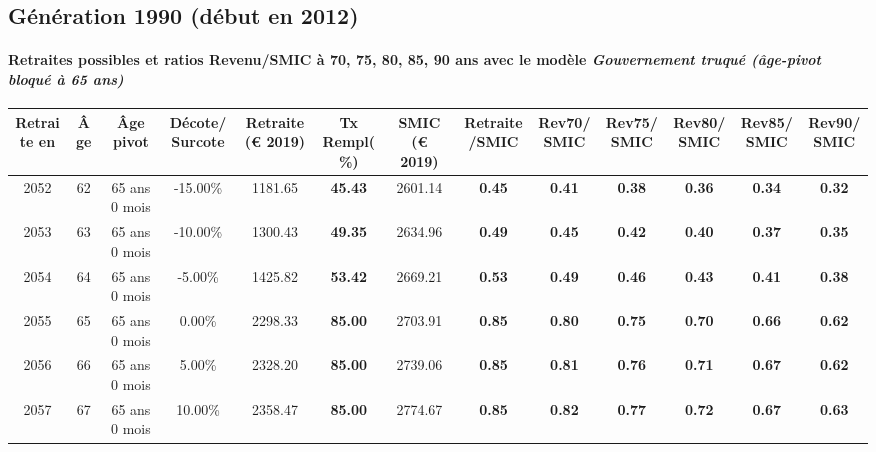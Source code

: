 \newpage 
 
\subsection{Génération 1990 (début en 2012)} 

\paragraph{Retraites possibles et ratios Revenu/SMIC à 70, 75, 80, 85, 90 ans avec le modèle \emph{Gouvernement truqué (âge-pivot bloqué à 65 ans)}}  
 
{ \scriptsize \begin{center} 
\begin{tabular}[htb]{|c|c||c|c||c|c||c||c|c|c|c|c|c|} 
\hline 
 Retraite en &  Âge &  Âge pivot &  Décote/Surcote &  Retraite (\euro{} 2019) &  Tx Rempl(\%) &  SMIC (\euro{} 2019) &  Retraite/SMIC &  Rev70/SMIC &  Rev75/SMIC &  Rev80/SMIC &  Rev85/SMIC &  Rev90/SMIC \\ 
\hline \hline 
 2052 &  62 &  65 ans 0 mois &  -15.00\% &  1181.65 &  {\bf 45.43} &  2601.14 &  {\bf {\color{red} 0.45}} &  {\bf {\color{red} 0.41}} &  {\bf {\color{red} 0.38}} &  {\bf {\color{red} 0.36}} &  {\bf {\color{red} 0.34}} &  {\bf {\color{red} 0.32}} \\ 
\hline 
 2053 &  63 &  65 ans 0 mois &  -10.00\% &  1300.43 &  {\bf 49.35} &  2634.96 &  {\bf {\color{red} 0.49}} &  {\bf {\color{red} 0.45}} &  {\bf {\color{red} 0.42}} &  {\bf {\color{red} 0.40}} &  {\bf {\color{red} 0.37}} &  {\bf {\color{red} 0.35}} \\ 
\hline 
 2054 &  64 &  65 ans 0 mois &  -5.00\% &  1425.82 &  {\bf 53.42} &  2669.21 &  {\bf {\color{red} 0.53}} &  {\bf {\color{red} 0.49}} &  {\bf {\color{red} 0.46}} &  {\bf {\color{red} 0.43}} &  {\bf {\color{red} 0.41}} &  {\bf {\color{red} 0.38}} \\ 
\hline 
 2055 &  65 &  65 ans 0 mois &  0.00\% &  2298.33 &  {\bf 85.00} &  2703.91 &  {\bf {\color{red} 0.85}} &  {\bf {\color{red} 0.80}} &  {\bf {\color{red} 0.75}} &  {\bf {\color{red} 0.70}} &  {\bf {\color{red} 0.66}} &  {\bf {\color{red} 0.62}} \\ 
\hline 
 2056 &  66 &  65 ans 0 mois &  5.00\% &  2328.20 &  {\bf 85.00} &  2739.06 &  {\bf {\color{red} 0.85}} &  {\bf {\color{red} 0.81}} &  {\bf {\color{red} 0.76}} &  {\bf {\color{red} 0.71}} &  {\bf {\color{red} 0.67}} &  {\bf {\color{red} 0.62}} \\ 
\hline 
 2057 &  67 &  65 ans 0 mois &  10.00\% &  2358.47 &  {\bf 85.00} &  2774.67 &  {\bf {\color{red} 0.85}} &  {\bf {\color{red} 0.82}} &  {\bf {\color{red} 0.77}} &  {\bf {\color{red} 0.72}} &  {\bf {\color{red} 0.67}} &  {\bf {\color{red} 0.63}} \\ 
\hline 
\hline 
\end{tabular} 
\end{center} } 
